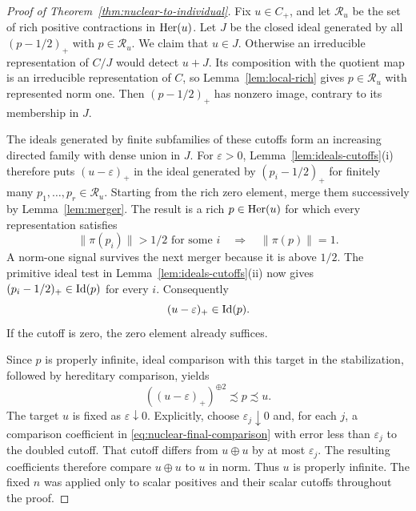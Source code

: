 \begin{proof}[Proof of Theorem~\ref{thm:nuclear-to-individual}]
Fix \(u\in C_+\), and let \(\mathcal R_u\) be the set of rich positive
contractions in \(\operatorname{Her}(u)\).  Let \(J\) be the closed ideal generated
by all \((p-1/2)_+\) with \(p\in\mathcal R_u\).  We claim that
\(u\in J\).  Otherwise an irreducible representation of \(C/J\)
would detect \(u+J\).  Its composition with the quotient map is an
irreducible representation of \(C\), so Lemma~\ref{lem:local-rich}
gives \(p\in\mathcal R_u\) with represented norm one.  Then
\((p-1/2)_+\) has nonzero image, contrary to its membership in \(J\).

The ideals generated by finite subfamilies of these cutoffs form an
increasing directed family with dense union in \(J\).  For
\(\varepsilon>0\), Lemma~\ref{lem:ideals-cutoffs}(i) therefore puts
\((u-\varepsilon)_+\) in the ideal generated by
\((p_i-1/2)_+\) for finitely many \(p_1,\ldots,p_r\in\mathcal R_u\).
Starting from the rich zero element, merge them successively by
Lemma~\ref{lem:merger}.  The result is a rich \(p\in\operatorname{Her}(u)\) for
which every representation satisfies
\[
 \|\pi(p_i)\|>1/2\text{ for some }i
 \quad\Longrightarrow\quad\|\pi(p)\|=1.
\]
A norm-one signal survives the next merger because it is above
\(1/2\).  The primitive ideal test in
Lemma~\ref{lem:ideals-cutoffs}(ii) now gives
\((p_i-1/2)_+\in\operatorname{Id}(p)\) for every \(i\).  Consequently
\begin{equation}\label{eq:nuclear-final-ideal}
 (u-\varepsilon)_+\in\operatorname{Id}(p).
\end{equation}
If the cutoff is zero, the zero element already suffices.

Since \(p\) is properly infinite, ideal comparison with this target in
the stabilization, followed by hereditary comparison, yields
\begin{equation}\label{eq:nuclear-final-comparison}
 ((u-\varepsilon)_+)^{\oplus2}\precsim p\precsim u.
\end{equation}
The target \(u\) is fixed as \(\varepsilon\downarrow0\).  Explicitly,
choose \(\varepsilon_j\downarrow0\) and, for each \(j\), a comparison
coefficient in \eqref{eq:nuclear-final-comparison} with error less
than \(\varepsilon_j\) to the doubled cutoff.  That cutoff differs
from \(u\oplus u\) by at most \(\varepsilon_j\).  The resulting
coefficients therefore compare \(u\oplus u\) to \(u\) in norm.
Thus \(u\) is properly infinite.  The fixed \(n\) was applied only
to scalar positives and their scalar cutoffs throughout the proof.
\end{proof}

